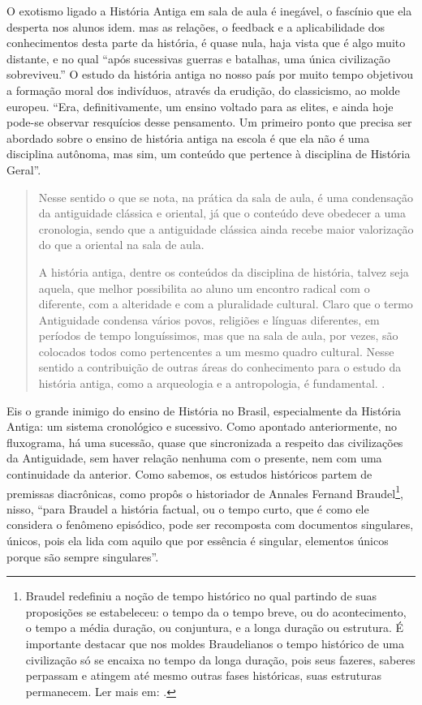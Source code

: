 \begin{refsection}
    O exotismo ligado a História Antiga em sala de aula é inegável, o fascínio que ela desperta nos alunos idem. mas as relações, o feedback e a aplicabilidade dos conhecimentos desta parte da história, é quase nula, haja vista que é algo muito distante, e no qual ``após sucessivas guerras e batalhas, uma única civilização sobreviveu.'' O estudo da história antiga no nosso país por muito tempo objetivou a formação moral dos indivíduos, através da erudição, do classicismo, ao molde europeu. ``Era, definitivamente, um ensino voltado para as elites, e ainda hoje pode-se observar resquícios desse pensamento. Um primeiro ponto que precisa ser abordado sobre o ensino de história antiga na escola é que ela não é uma disciplina autônoma, mas sim, um conteúdo que pertence à disciplina de História Geral''.

    \begin{quotation}
        Nesse sentido o que se nota, na prática da sala de aula, é uma condensação da antiguidade clássica e oriental, já que o conteúdo deve obedecer a uma cronologia, sendo que a antiguidade clássica ainda recebe maior valorização do que a oriental na sala de aula.  

        A história antiga, dentre os conteúdos da disciplina de história, talvez seja aquela, que melhor possibilita ao aluno um encontro radical com o diferente, com a alteridade e com a pluralidade cultural. Claro que o termo Antiguidade condensa vários povos, religiões e línguas diferentes, em períodos de tempo longuíssimos, mas que na sala de aula, por vezes, são colocados todos como pertencentes a um mesmo quadro cultural. Nesse sentido a contribuição de outras áreas do conhecimento para o estudo da história antiga, como a arqueologia e a antropologia, é fundamental. \cite[p.~6]{SilvaAndGoncalves2015Ensino}. 
    \end{quotation}

    Eis o grande inimigo do ensino de História no Brasil, especialmente da História Antiga: um sistema cronológico e sucessivo. Como apontado anteriormente, no fluxograma, há uma sucessão, quase que sincronizada a respeito das civilizações da Antiguidade, sem haver relação nenhuma com o presente, nem com uma continuidade da anterior. Como sabemos, os estudos históricos partem de premissas diacrônicas, como propôs o historiador de Annales Fernand Braudel\footnote{Braudel redefiniu a noção de tempo histórico no qual partindo de suas proposições se estabeleceu: o tempo da o tempo breve, ou do acontecimento, o tempo a média duração, ou conjuntura, e a longa duração ou estrutura. É importante destacar que nos moldes Braudelianos o tempo histórico de uma civilização só se encaixa no tempo da longa duração, pois seus fazeres, saberes perpassam e atingem até mesmo outras fases históricas, suas estruturas permanecem. Ler mais em: .}, nisso, ``para Braudel a história factual, ou o tempo curto, que é como ele considera o fenômeno episódico, pode ser recomposta com documentos singulares, únicos, pois ela lida com aquilo que por essência é singular, elementos únicos porque são sempre singulares''.


\end{refsection}
